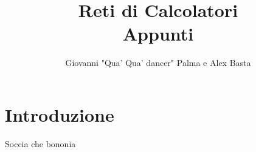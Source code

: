 \documentclass{report}
\title{\Huge{Reti di Calcolatori}\\Appunti}
\author{\huge{Giovanni "Qua' Qua' dancer" Palma e Alex Basta}}
\date{}
\begin{document}
\maketitle
\newpage%
\tableofcontents

\pagebreak

\chapter{Introduzione}
Soccia che bononia









\end{document}
